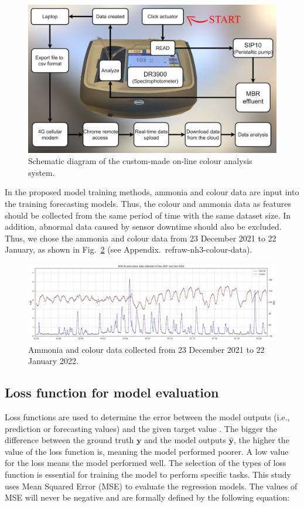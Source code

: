 \begin{figure}[h]
    \centering
    \includegraphics[width=0.8\columnwidth]{imgs/instrument/colour-sampler.png}
    \caption{Schematic diagram of the custom-made on-line colour analysis system.}
    \label{fig:diagram-colour-analysis}
 \end{figure}

 In the proposed model training methods, ammonia and colour data are input into the training forecasting models. Thus, the colour and ammonia data as features should be collected from the same period of time with the same dataset size. In addition, abnormal data caused by sensor downtime should also be excluded. Thus, we chose the ammonia and colour data from 23 December 2021 to 22 January, as shown in Fig.~\ref{fig:nh3-color-data} (see Appendix.~ref{raw-nh3-colour-data}).

\begin{figure}[h]
    \centering
    \includegraphics[width=1.0\columnwidth]{imgs/results/data.png}
    \caption{Ammonia and colour data collected from 23 December 2021 to 22  January 2022.}
    \label{fig:nh3-color-data}
\end{figure}

\subsection{Loss function for model evaluation}
Loss functions are used to determine the error between the model outputs (i.e., prediction or forecasting values) and the given target value \citep{deepaiLossFunction2022}. The bigger the difference between the ground truth $\bm{y}$ and the model outputs $\bm{\hat{y}}$, the higher the value of the loss function is, meaning the model performed poorer. A low value for the loss means the model performed well. The selection of the types of loss function is essential for training the model to perform specific tasks. This study uses Mean Squared Error (MSE) to evaluate the regression models. The values of MSE will never be negative and are formally defined by the following equation:

